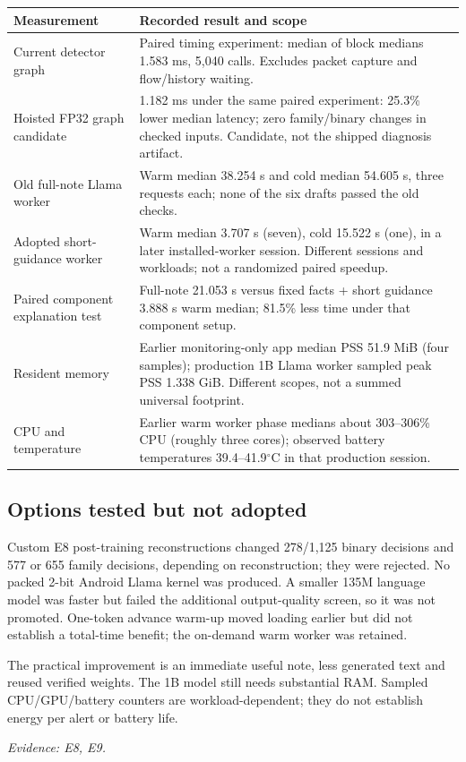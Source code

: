 \documentclass[11pt,a4paper]{article}
\newcommand{\source}[1]{{\small\textit{Evidence: #1.}\par}}
\begin{document}
\begin{tabularx}{\textwidth}{@{}L{55mm}Y@{}}
\toprule Measurement & Recorded result and scope\\\midrule
Current detector graph & Paired timing experiment: median of block medians 1.583 ms, 5,040 calls. Excludes packet capture and flow/history waiting.\\
Hoisted FP32 graph candidate & 1.182 ms under the same paired experiment: 25.3\% lower median latency; zero family/binary changes in checked inputs. Candidate, not the shipped diagnosis artifact.\\
Old full-note Llama worker & Warm median 38.254 s and cold median 54.605 s, three requests each; none of the six drafts passed the old checks.\\
Adopted short-guidance worker & Warm median 3.707 s (seven), cold 15.522 s (one), in a later installed-worker session. Different sessions and workloads; not a randomized paired speedup.\\
Paired component explanation test & Full-note 21.053 s versus fixed facts + short guidance 3.888 s warm median; 81.5\% less time under that component setup.\\
Resident memory & Earlier monitoring-only app median PSS 51.9 MiB (four samples); production 1B Llama worker sampled peak PSS 1.338 GiB. Different scopes, not a summed universal footprint.\\
CPU and temperature & Earlier warm worker phase medians about 303--306\% CPU (roughly three cores); observed battery temperatures 39.4--41.9$^{\circ}$C in that production session.\\
\bottomrule
\end{tabularx}

\subsection*{Options tested but not adopted}
Custom E8 post-training reconstructions changed 278/1,125 binary decisions and
577 or 655 family decisions, depending on reconstruction; they were rejected.
No packed 2-bit Android Llama kernel was produced. A smaller 135M language model was
faster but failed the additional output-quality screen, so it was not promoted.
One-token advance warm-up moved loading earlier but did not establish a total-time
benefit; the on-demand warm worker was retained.

The practical improvement is an immediate useful note, less generated text and reused
verified weights. The 1B model still needs substantial RAM. Sampled CPU/GPU/battery
counters are workload-dependent; they do not establish energy per alert or battery life.
\source{E8, E9}
\end{document}
